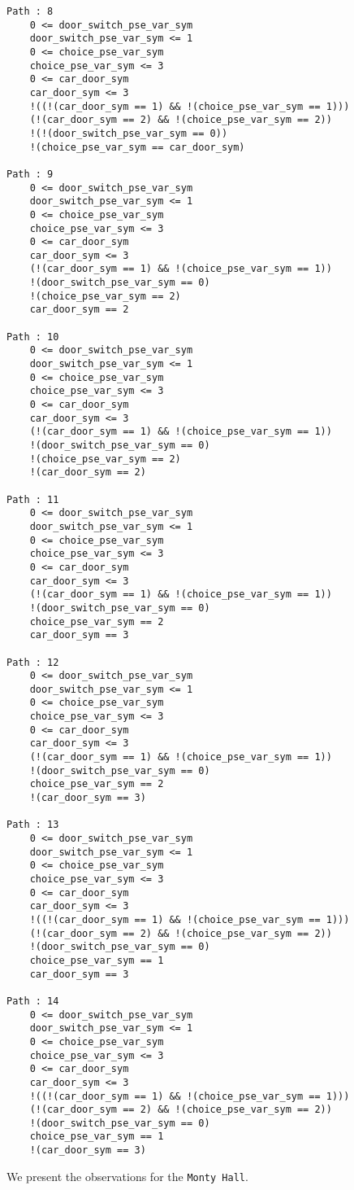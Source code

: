 \documentclass{article}
\begin{document}
\begin{verbatim}
Path : 8
	0 <= door_switch_pse_var_sym
	door_switch_pse_var_sym <= 1
	0 <= choice_pse_var_sym
	choice_pse_var_sym <= 3
	0 <= car_door_sym
	car_door_sym <= 3
	!((!(car_door_sym == 1) && !(choice_pse_var_sym == 1)))
	(!(car_door_sym == 2) && !(choice_pse_var_sym == 2))
	!(!(door_switch_pse_var_sym == 0))
	!(choice_pse_var_sym == car_door_sym)
	
Path : 9
	0 <= door_switch_pse_var_sym
	door_switch_pse_var_sym <= 1
	0 <= choice_pse_var_sym
	choice_pse_var_sym <= 3
	0 <= car_door_sym
	car_door_sym <= 3
	(!(car_door_sym == 1) && !(choice_pse_var_sym == 1))
	!(door_switch_pse_var_sym == 0)
	!(choice_pse_var_sym == 2)
	car_door_sym == 2
	
Path : 10
	0 <= door_switch_pse_var_sym
	door_switch_pse_var_sym <= 1
	0 <= choice_pse_var_sym
	choice_pse_var_sym <= 3
	0 <= car_door_sym
	car_door_sym <= 3
	(!(car_door_sym == 1) && !(choice_pse_var_sym == 1))
	!(door_switch_pse_var_sym == 0)
	!(choice_pse_var_sym == 2)
	!(car_door_sym == 2)
	
Path : 11
	0 <= door_switch_pse_var_sym
	door_switch_pse_var_sym <= 1
	0 <= choice_pse_var_sym
	choice_pse_var_sym <= 3
	0 <= car_door_sym
	car_door_sym <= 3
	(!(car_door_sym == 1) && !(choice_pse_var_sym == 1))
	!(door_switch_pse_var_sym == 0)
	choice_pse_var_sym == 2
	car_door_sym == 3
	
Path : 12
	0 <= door_switch_pse_var_sym
	door_switch_pse_var_sym <= 1
	0 <= choice_pse_var_sym
	choice_pse_var_sym <= 3
	0 <= car_door_sym
	car_door_sym <= 3
	(!(car_door_sym == 1) && !(choice_pse_var_sym == 1))
	!(door_switch_pse_var_sym == 0)
	choice_pse_var_sym == 2
	!(car_door_sym == 3)
	
Path : 13
	0 <= door_switch_pse_var_sym
	door_switch_pse_var_sym <= 1
	0 <= choice_pse_var_sym
	choice_pse_var_sym <= 3
	0 <= car_door_sym
	car_door_sym <= 3
	!((!(car_door_sym == 1) && !(choice_pse_var_sym == 1)))
	(!(car_door_sym == 2) && !(choice_pse_var_sym == 2))
	!(door_switch_pse_var_sym == 0)
	choice_pse_var_sym == 1
	car_door_sym == 3
	
Path : 14
	0 <= door_switch_pse_var_sym
	door_switch_pse_var_sym <= 1
	0 <= choice_pse_var_sym
	choice_pse_var_sym <= 3
	0 <= car_door_sym
	car_door_sym <= 3
	!((!(car_door_sym == 1) && !(choice_pse_var_sym == 1)))
	(!(car_door_sym == 2) && !(choice_pse_var_sym == 2))
	!(door_switch_pse_var_sym == 0)
	choice_pse_var_sym == 1
	!(car_door_sym == 3)
	\end{verbatim}


We present the observations for the \texttt{Monty Hall}. \\ \\ \\ 
\end{document}
